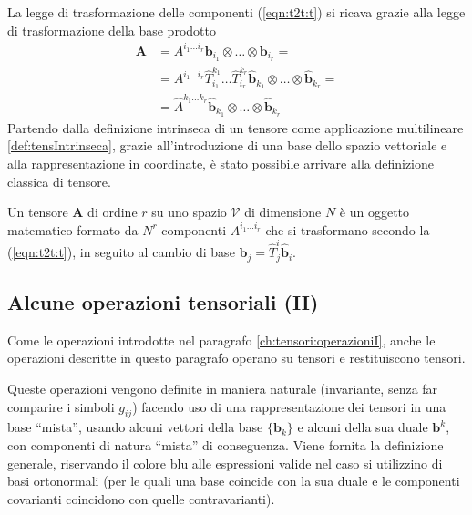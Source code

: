  La legge di trasformazione delle componenti (\ref{eqn:t2t:t}) si ricava grazie alla legge di trasformazione della base prodotto
 \begin{equation}
 \begin{aligned}
  \bm{A} & =  A^{i_1 \dots i_r} \bm{b}_{i_1} \otimes \dots \otimes \bm{b}_{i_r} = \\
   & = A^{i_1 \dots i_r}
     \hat{T}^{k_1}_{i_1}\dots \hat{T}^{k_r}_{i_r} 
     \bm{\hat{b}}_{k_1} \otimes \dots \otimes \bm{\hat{b}}_{k_r} = \\ 
   & = \hat{A}^{k_1 \dots k_r} \bm{\hat{b}}_{k_1} \otimes \dots \otimes \bm{\hat{b}}_{k_r}
 \end{aligned}
 \end{equation}
%
Partendo dalla definizione intrinseca di un tensore come applicazione multilineare \ref{def:tensIntrinseca}, grazie all'introduzione di una base dello spazio vettoriale e alla rappresentazione in coordinate, è stato possibile arrivare alla definizione classica di tensore.
\vspace{15pt}
\begin{definition}
Un tensore $\bm{A}$ di ordine $r$ su uno spazio $\mathcal{V}$ di dimensione $N$ è un oggetto matematico formato da $N^r$ componenti $A^{i_1 \dots i_r}$ che si trasformano secondo la (\ref{eqn:t2t:t}), in seguito al cambio di base $\bm{b}_j = \hat{T}^i_j \bm{\hat{b}}_i$.
\end{definition}

%
 \subsection{Alcune operazioni tensoriali (II)}\label{ch:tensori:operazioniII}
%
 Come le operazioni introdotte nel paragrafo \ref{ch:tensori:operazioniI}, anche le operazioni descritte in questo paragrafo operano su tensori e restituiscono tensori.
\begin{remark}
 Queste operazioni vengono definite in maniera naturale (invariante, senza far comparire i simboli $g_{ij}$) facendo uso di una rappresentazione dei tensori in una base ``mista'', usando alcuni vettori della base $\{ \bm{b}_k\}$ e alcuni della sua duale $\bm{b}^k$, con componenti di natura ``mista'' di conseguenza. Viene fornita la definizione generale, {\color{blue} riservando il colore blu alle espressioni valide nel caso si utilizzino di basi ortonormali (per le quali una base coincide con la sua duale e le componenti covarianti coincidono con quelle contravarianti).}
\end{remark}

